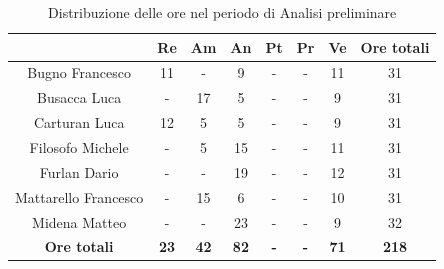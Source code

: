 \begin{table}[H]
  \centering
  \renewcommand{\arraystretch}{1.8}
  \begin{tabular}{c|c|c|c|c|c|c|c}
    \rowcolor[HTML]{125E28}
    \multicolumn{1}{c}{\color[HTML]{FFFFFF}\textbf{ Nominativo }}
                         & \multicolumn{1}{c}{\color[HTML]{FFFFFF}\textbf{ Re }}
                         & \multicolumn{1}{c}{\color[HTML]{FFFFFF}\textbf{ Am}}
                         & \multicolumn{1}{c}{\color[HTML]{FFFFFF}\textbf{ An }}
                         & \multicolumn{1}{c}{\color[HTML]{FFFFFF}\textbf{ Pt }}
                         & \multicolumn{1}{c}{\color[HTML]{FFFFFF}\textbf{ Pr }}
                         & \multicolumn{1}{c}{\color[HTML]{FFFFFF}\textbf{ Ve }}
                         & \multicolumn{1}{c}{\color[HTML]{FFFFFF}\textbf{ Ore totali }}                                                                                    \\
    \hline
    Bugno Francesco      & 11                                                            & -           & 9           & -          & -          & 11          & 31           \\
    Busacca Luca         & -                                                             & 17          & 5           & -          & -          & 9           & 31           \\
    Carturan Luca        & 12                                                            & 5           & 5           & -          & -          & 9           & 31           \\
    Filosofo Michele     & -                                                             & 5           & 15          & -          & -          & 11          & 31           \\
    Furlan Dario         & -                                                             & -           & 19          & -          & -          & 12          & 31           \\
    Mattarello Francesco & -                                                             & 15          & 6           & -          & -          & 10          & 31           \\
    Midena Matteo        & -                                                             & -           & 23          & -          & -          & 9           & 32           \\
    \textbf{Ore totali}  & \textbf{23}                                                   & \textbf{42} & \textbf{82} & \textbf{-} & \textbf{-} & \textbf{71} & \textbf{218}
  \end{tabular}
  \caption{Distribuzione delle ore nel periodo di Analisi preliminare}
\end{table}

